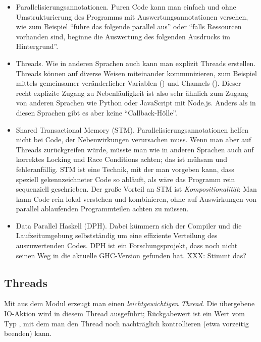 \documentclass{uebblatt}
\begin{document}
\begin{itemize}
\item Parallelisierungsannotationen. Puren Code kann man einfach und ohne
Umstrukturierung des Programms mit Auswertungsannotationen versehen, wie zum
Beispiel "`führe das folgende  parallel aus"' oder "`falls
Ressourcen vorhanden sind, beginne die Auswertung des folgenden Ausdrucks im
Hintergrund"'.
\item Threads. Wie in anderen Sprachen auch kann man explizit Threads
erstellen. Threads können auf diverse Weisen miteinander kommunizieren, zum
Beispiel mittels gemeinsamer veränderlicher Variablen ()
und Channels (). Dieser recht explizite Zugang zu
Nebenläufigkeit ist also sehr ähnlich zum Zugang von anderen Sprachen wie
Python oder JavaScript mit Node.js. Anders als in diesen Sprachen gibt es aber
keine "`Callback-Hölle"'.
\item Shared Transactional Memory (STM). Parallelisierungsannotationen helfen
nicht bei Code, der Nebenwirkungen verursachen muss. Wenn man aber auf Threads
zurückgreifen würde, müsste man wie in anderen Sprachen auch auf korrektes
Locking und Race Conditions achten; das ist mühsam und fehleranfällig. STM ist
eine Technik, mit der man vorgeben kann, dass speziell gekennzeichneter Code so
abläuft, als wäre das Programm rein sequenziell geschrieben. Der große Vorteil
an STM ist \emph{Kompositionalität}: Man kann Code rein lokal verstehen und
kombinieren, ohne auf Auswirkungen von parallel ablaufenden Programmteilen
achten zu müssen.
\item Data Parallel Haskell (DPH). Dabei kümmern sich der Compiler und die
Laufzeitumgebung selbstständig um eine effiziente Verteilung des auszuwertenden
Codes. DPH ist ein Forschungsprojekt, dass noch nicht seinen Weg in die
aktuelle GHC-Version gefunden hat. XXX: Stimmt das?
\end{itemize}


\subsection{Threads}

Mit  aus dem Modul
 erzeugt man einen \emph{leichtgewichtigen
Thread}. Die übergebene IO-Aktion wird in diesem Thread ausgeführt;
Rückgabewert ist ein Wert vom Typ , mit dem man den
Thread noch nachträglich kontrollieren (etwa vorzeitig beenden) kann.
\end{document}
